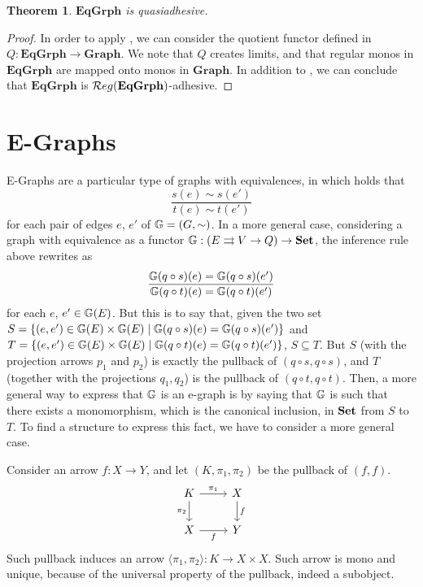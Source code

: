 \documentclass[a4paper, twoside,openright]{report}
\theoremstyle{plain}
\newtheorem{theorem}{Theorem}[section]
\theoremstyle{definition}
\begin{document}
\begin{theorem}
    $\mathbf{EqGrph}$ is quasiadhesive.
\end{theorem}

\begin{proof}
    In order to apply , we can consider the quotient functor defined in  $Q: \mathbf{EqGrph \rightarrow Graph}$. We note that $Q$ creates limits, and that regular monos in $\mathbf{EqGrph}$ are mapped onto monos in $\mathbf{Graph}$. In addition to , we can conclude that $\mathbf{EqGrph}$ is $\mathcal{R}eg(\mathbf{EqGrph})$-adhesive.
\end{proof}


\section{E-Graphs}\label{sect:eggs}

E-Graphs are a particular type of graphs with equivalences, in which holds that
$$
    \frac{s(e) \sim s(e')}{t(e) \sim t(e')}
$$
for each pair of edges $e$, $e'$ of $\mathbb{G} = (G, \sim)$.
In a more general case, considering a graph with equivalence as a functor $\mathbb{G} : (E \rightrightarrows V \rightarrow Q) \rightarrow \mathbf{Set}$, the inference rule above rewrites as
\[
    \frac{\mathbb{G}(q \circ s)(e) = \mathbb{G}(q \circ s)(e')}{\mathbb{G}(q \circ t)(e) = \mathbb{G}(q \circ t)(e')}
\] for each $e$, $e' \in \mathbb{G}(E)$.
But this is to say that, given the two set $S = \{ (e, e') \in \mathbb{G}(E) \times \mathbb{G}(E) \mid \mathbb{G}(q \circ s)(e) = \mathbb{G}(q \circ s)(e') \}$ and $T =\{ (e, e') \in \mathbb{G}(E) \times \mathbb{G}(E) \mid \mathbb{G}(q \circ t)(e) = \mathbb{G}(q \circ t)(e') \} $, $S \subseteq T$. But $S$ (with the projection arrows $p_1$ and $p_2$) is exactly the pullback of $(q \circ s, q \circ s)$, and $T$ (together with the projections $q_1, q_2$) is the pullback of $(q \circ t, q \circ t)$. Then, a more general way to express that $\mathbb{G}$ is an e-graph is by saying that $\mathbb{G}$ is such that there exists a monomorphism, which is the canonical inclusion, in $\mathbf{Set}$ from $S$ to $T$.
To find a structure to express this fact, we have to consider a more general case.

Consider an arrow $f: X \rightarrow Y$, and let $(K, \pi_1, \pi_2)$ be the pullback of $(f, f)$.
\[
    \begin{tikzcd}
        K \arrow[r, "{\pi_1}"] \arrow[d, "{\pi_2}"swap] & X \arrow[d, "f"] \\
        X \arrow[r, "f"swap] & Y
    \end{tikzcd}
\]
Such pullback induces an arrow $\langle \pi_1, \pi_2 \rangle : K \rightarrow X\times X$. Such arrow is mono and unique, because of the universal property of the pullback, indeed a subobject.
\end{document}
